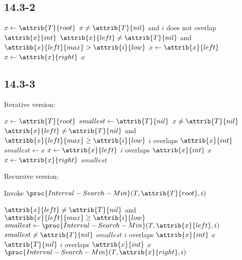 \subsection*{14.3-2}

\begin{codebox}
    \li $x \gets \attrib{T}{root}$
    \li \While $x \neq \attrib{T}{nil}$ and $i$ does not overlap $\attrib{x}{int}$
    \li \Do
            \If $\attrib{x}{left} \neq \attrib{T}{nil}$ and 
                $\attribb{x}{left}{max} > \attrib{i}{low}$
    \li     \Then
                $x \gets \attrib{x}{left}$
    \li     \Else
                $x \gets \attrib{x}{right}$
            \End
        \End
    \li \Return $x$
\end{codebox}

\subsection*{14.3-3}

\noindent
Iterative version:

\begin{codebox}
    \li $x \gets \attrib{T}{root}$
    \li $smallest \gets \attrib{T}{nil}$
    \li \While $x \neq \attrib{T}{nil}$
    \li \Do
            \If $\attrib{x}{left} \neq \attrib{T}{nil}$ and
                $\attribb{x}{left}{max} \geq \attrib{i}{low}$
            \Then
    \li         \If $i$ overlaps $\attrib{x}{int}$
    \li         \Then
                    $smallest \gets x$
                \End
    \li         $x \gets \attrib{x}{left}$
    \li     \Else
                \If $i$ overlaps $\attrib{x}{int}$
    \li         \Then
                    \Return $x$
                \End
    \li         $x \gets \attrib{x}{right}$
            \End
        \End
    \li \Return $smallest$
\end{codebox}

\noindent
Recursive version:

Invoke $\proc{Interval-Search-Min}(T, \attrib{T}{root}, i)$

\begin{codebox}
    \li \If $\attrib{x}{left} \neq \attrib{T}{nil}$ and
            $\attribb{x}{left}{max} \geq \attrib{i}{low}$
    \li \Then
            $smallest \gets \proc{Interval-Search-Min}(T, \attrib{x}{left}, i)$
    \li     \If $smallest \neq \attrib{T}{nil}$
    \li     \Then
                \Return $smallest$
    \li     \ElseIf $i$ overlaps $\attrib{x}{int}$
    \li     \Then
                \Return $x$
    \li     \Else
                \Return $\attrib{T}{nil}$
            \End
    \li \Else
            \If $i$ overlaps $\attrib{x}{int}$
            \Then
    \li         \Return $x$
    \li     \Else
                \Return $\proc{Interval-Search-Min}(T, \attrib{x}{right}, i)$
            \End
        \End
\end{codebox}

